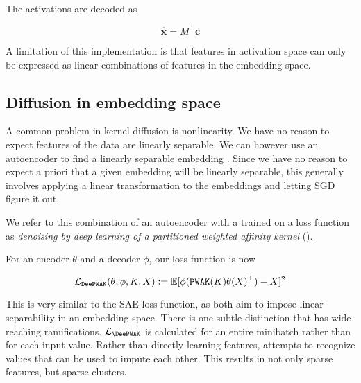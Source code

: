 The activations are decoded as

\begin{equation}
  \mathbf{\hat{x}} = M^\top\mathbf{c}
\end{equation}

A limitation of this implementation is that features in activation space can only be expressed as linear combinations of features in the embedding space.

\subsection{Diffusion in embedding space}

A common problem in kernel diffusion is nonlinearity.
We have no reason to expect features of the data are linearly separable.
We can however use an autoencoder to find a linearly separable embedding \cite{xie2016unsupervised}.
Since we have no reason to expect a priori that a given embedding will be linearly separable,
this generally involves applying a linear transformation to the embeddings and letting SGD figure it out.

We refer to this combination of an autoencoder with a \Partitioner trained on a \PWAK loss function as \textit{denoising by deep learning of a partitioned weighted affinity kernel} (\DeePWAK).

For an encoder $\theta$ and a decoder $\phi$, our loss function is now

\begin{equation}
  \mathcal{L}_{\mathop{\mathtt{DeePWAK}}\limits}(\theta,\phi,K,X) := \mathbb{E}[\phi(\mathop{\mathtt{PWAK}}\limits(K)\theta(X)^\top) - X]^2
\end{equation}

This is very similar to the SAE loss function, as both aim to impose linear separability in an embedding space.
There is one subtle distinction that has wide-reaching ramifications.
$\mathcal{L}_{\DeePWAK}$ is calculated for an entire minibatch rather than for each input value.
Rather than directly learning features, \DeePWAK attempts to recognize values that can be used to impute each other.
This results in not only sparse features, but sparse clusters.

